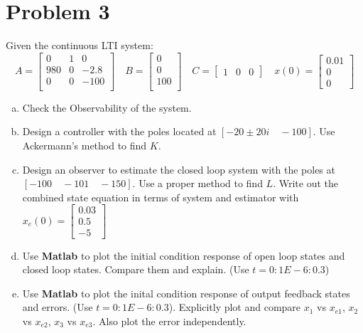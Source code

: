\documentclass{article}
\begin{document}
\section*{Problem 3}
Given the continuous LTI system:
$$
A =
\begin{bmatrix}
0 & 1 & 0  \\
980 & 0 & -2.8 \\
0 & 0 & -100 \\
\end{bmatrix}
\quad
B =
\begin{bmatrix}
0 \\
0 \\
100 \\
\end{bmatrix}
\quad
C =
\begin{bmatrix} 1 & 0 & 0 \end{bmatrix}
\quad
x(0) =
\begin{bmatrix} 0.01 \\ 0 \\ 0 \end{bmatrix}
$$

\begin{enumerate}[a.]
\item Check the Observability of the system.
\newline

\item Design a controller with the poles located at $[-20\pm20i \quad -100]$. Use Ackermann's method to find $K$.
\newline

\item Design an observer to estimate the closed loop system with the poles at $[-100 \quad -101 \quad -150]$.
Use a proper method to find $L$.
Write out the combined state equation in terms of system and estimator with $x_e(0) = \begin{bmatrix} 0.03 \\ 0.5 \\ -5 \end{bmatrix}$
\newline

\item Use \textbf{Matlab} to plot the initial condition response of open loop states and closed loop states.
Compare them and explain.
(Use $ t = 0:1E-6:0.3$)
\newline

\item Use \textbf{Matlab} to plot the inital condition response of output feedback states and errors.
(Use $ t = 0:1E-6:0.3$).
Explicitly plot and compare $x_1$ vs $x_{e1}$, $x_2$ vs $x_{e2}$, $x_3$ vs $x_{e3}$. Also plot the error independently.
\newline

\end{enumerate}
\end{document}
